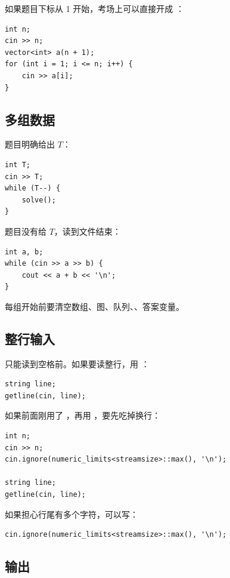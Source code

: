 如果题目下标从 1 开始，考场上可以直接开成 ：

\begin{lstlisting}
int n;
cin >> n;
vector<int> a(n + 1);
for (int i = 1; i <= n; i++) {
    cin >> a[i];
}
\end{lstlisting}

\subsection{多组数据}

题目明确给出 $T$：

\begin{lstlisting}
int T;
cin >> T;
while (T--) {
    solve();
}
\end{lstlisting}

题目没有给 $T$，读到文件结束：

\begin{lstlisting}
int a, b;
while (cin >> a >> b) {
    cout << a + b << '\n';
}
\end{lstlisting}

每组开始前要清空数组、图、队列、、答案变量。

\subsection{整行输入}

 只能读到空格前。如果要读整行，用 ：

\begin{lstlisting}
string line;
getline(cin, line);
\end{lstlisting}

如果前面刚用了 ，再用 ，要先吃掉换行：

\begin{lstlisting}
int n;
cin >> n;
cin.ignore(numeric_limits<streamsize>::max(), '\n');

string line;
getline(cin, line);
\end{lstlisting}

如果担心行尾有多个字符，可以写：

\begin{lstlisting}
cin.ignore(numeric_limits<streamsize>::max(), '\n');
\end{lstlisting}

\subsection{输出}

